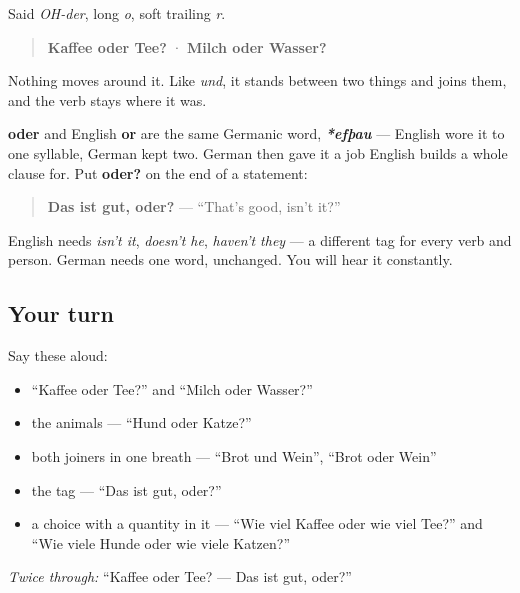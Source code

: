 Said \emph{OH-der}, long \emph{o}, soft trailing \emph{r}.

\begin{quote}
\textbf{Kaffee oder Tee?} · \textbf{Milch oder Wasser?}
\end{quote}

Nothing moves around it. Like \emph{und}, it stands between two things and joins them, and the verb stays where it was.

\begin{cousinweb}
\textbf{oder} and English \textbf{or} are the same Germanic word, \emph{\textbf{*efþau}} — English wore it to one syllable, German kept two. German then gave it a job English builds a whole clause for. Put \textbf{oder?} on the end of a statement:

\begin{quote}
\textbf{Das ist gut, oder?} — \textquotedblleft{}That's good, isn't it?\textquotedblright{}
\end{quote}

English needs \emph{isn't it}, \emph{doesn't he}, \emph{haven't they} — a different tag for every verb and person. German needs one word, unchanged. You will hear it constantly.
\end{cousinweb}

\subsection*{Your turn}
Say these aloud:

\begin{itemize}
\raggedright
  \item \textquotedblleft{}Kaffee oder Tee?\textquotedblright{} and \textquotedblleft{}Milch oder Wasser?\textquotedblright{}
  \item the animals — \textquotedblleft{}Hund oder Katze?\textquotedblright{}
  \item both joiners in one breath — \textquotedblleft{}Brot und Wein\textquotedblright{}, \textquotedblleft{}Brot oder Wein\textquotedblright{}
  \item the tag — \textquotedblleft{}Das ist gut, oder?\textquotedblright{}
  \item a choice with a quantity in it — \textquotedblleft{}Wie viel Kaffee oder wie viel Tee?\textquotedblright{} and \textquotedblleft{}Wie viele Hunde oder wie viele Katzen?\textquotedblright{}
\end{itemize}

\emph{Twice through:} \textquotedblleft{}Kaffee oder Tee? — Das ist gut, oder?\textquotedblright{}

